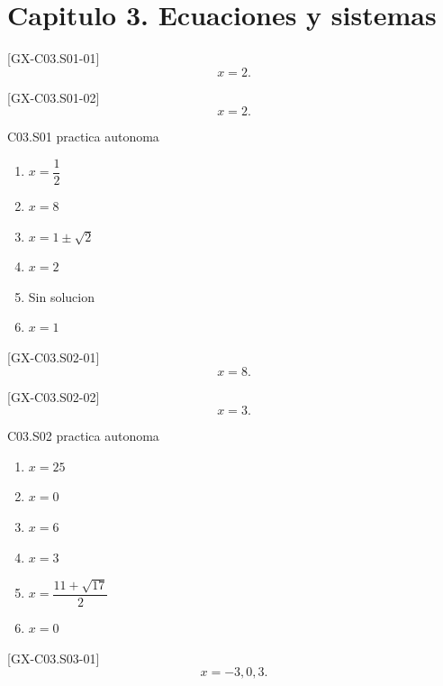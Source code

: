 \section*{Capitulo 3. Ecuaciones y sistemas}

\begin{shortanswer}{[GX-C03.S01-01]}
\[
x=2.
\]
\end{shortanswer}

\begin{shortanswer}{[GX-C03.S01-02]}
\[
x=2.
\]
\end{shortanswer}

\begin{shortanswer}{C03.S01 practica autonoma}
\begin{enumerate}[label=\textbf{PX-C03.S01-\arabic*:}, leftmargin=*]
  \item \(x=\dfrac{1}{2}\)
  \item \(x=8\)
  \item \(x=1\pm \sqrt{2}\)
  \item \(x=2\)
  \item Sin solucion
  \item \(x=1\)
\end{enumerate}
\end{shortanswer}

\begin{shortanswer}{[GX-C03.S02-01]}
\[
x=8.
\]
\end{shortanswer}

\begin{shortanswer}{[GX-C03.S02-02]}
\[
x=3.
\]
\end{shortanswer}

\begin{shortanswer}{C03.S02 practica autonoma}
\begin{enumerate}[label=\textbf{PX-C03.S02-\arabic*:}, leftmargin=*]
  \item \(x=25\)
  \item \(x=0\)
  \item \(x=6\)
  \item \(x=3\)
  \item \(x=\dfrac{11+\sqrt{17}}{2}\)
  \item \(x=0\)
\end{enumerate}
\end{shortanswer}

\begin{shortanswer}{[GX-C03.S03-01]}
\[
x=-3,0,3.
\]
\end{shortanswer}

